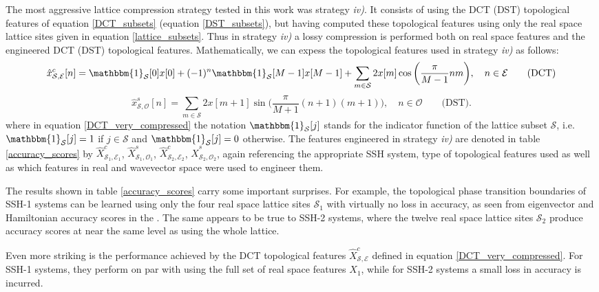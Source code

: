 \documentclass[10pt]{revtex4-1}
\begin{document}
The most aggressive lattice compression strategy tested in this work was strategy \emph{iv)}. It consists of using the DCT (DST) topological features of equation \eqref{DCT_subsets} (equation \eqref{DST_subsets}), but having computed these topological features using only the real space lattice sites given in equation \eqref{lattice_subsets}. Thus in strategy \emph{iv)} a lossy compression is performed both on real space features and the engineered DCT (DST) topological features. Mathematically, we can expess the topological features used in strategy \emph{iv)} as follows:
\begin{equation}
\label{DCT_very_compressed}
\hat{x}_{\mathcal{S}, \mathcal{E}}^c[n] = \mathbbm{1}_{\mathcal{S}}[0]x[0] + (-1)^n\mathbbm{1}_{\mathcal{S}}[M-1] x[M-1] + \sum_{m \in \mathcal{S}} 2x[m]\cos\bigg(\frac{\pi}{M-1}nm\bigg), \quad n \in \mathcal{E} \qquad \text{(DCT)} 
\end{equation}
\begin{equation}
\label{DST_very_compressed}
\hat{x}_{\mathcal{S}, \mathcal{O}}^s[n] = \sum_{m \in \mathcal{S}}2x[m+1]\sin\bigg(\frac{\pi}{M+1}(n+1)(m+1)\bigg), \quad n \in \mathcal{O} \qquad \text{(DST)}.
\end{equation}
where in equation \eqref{DCT_very_compressed} the notation $\mathbbm{1}_{\mathcal{S}}[j]$ stands for the indicator function of the lattice subset $\mathcal{S}$, i.e. $\mathbbm{1}_{\mathcal{S}}[j] = 1$ if $j \in \mathcal{S}$ and $\mathbbm{1}_{\mathcal{S}}[j] = 0$ otherwise. The features engineered in strategy \emph{iv)} are denoted in table \ref{accuracy_scores} by $\hat{X}^c_{\mathcal{S}_1,\mathcal{E}_1}$, $\hat{X}^s_{\mathcal{S}_1,\mathcal{O}_1}$, $\hat{X}^c_{\mathcal{S}_2,\mathcal{E}_2}$, $\hat{X}^s_{\mathcal{S}_2,\mathcal{O}_2}$, again referencing the appropriate SSH system, type of topological features used as well as which features in real and wavevector space were used to engineer them. 

The results shown in table \ref{accuracy_scores} carry some important surprises. For example, the topological phase transition boundaries of SSH-1 systems can be learned using only the four real space lattice sites $\mathcal{S}_1$ with virtually no loss in accuracy, as seen from eigenvector and Hamiltonian accuracy scores in the . The same appears to be true to SSH-2 systems, where the twelve real space lattice sites $\mathcal{S}_2$ produce accuracy scores at near the same level as using the whole lattice.    

Even more striking is the performance achieved by the DCT topological features $\hat{X}^c_{\mathcal{S},\mathcal{E}}$ defined in equation \eqref{DCT_very_compressed}. For SSH-1 systems, they perform on par with using the full set of real space features $X_1$, while for SSH-2 systems a small loss in accuracy is incurred.
\end{document}
